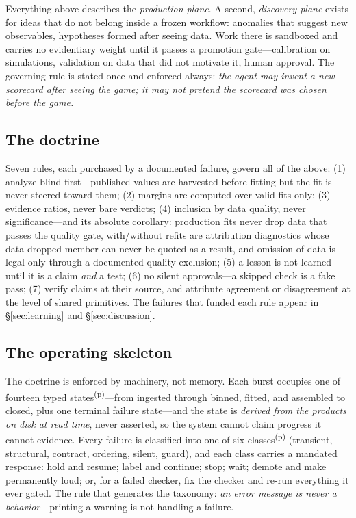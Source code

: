 \documentclass[twocolumn]{aastex631}
\newcommand{\prov}{\textsuperscript{(p)}}   %
\begin{document}
Everything above describes the \emph{production plane}. A second,
\emph{discovery plane} exists for ideas that do not belong inside a frozen
workflow: anomalies that suggest new observables, hypotheses formed after
seeing data. Work there is sandboxed and carries no evidentiary weight until
it passes a promotion gate---calibration on simulations, validation on data
that did not motivate it, human approval. The governing rule is stated once
and enforced always: \emph{the agent may invent a new scorecard after seeing
the game; it may not pretend the scorecard was chosen before the game.}

\subsection{The doctrine} \label{sec:doctrine}

Seven rules, each purchased by a documented failure, govern all of the
above: (1) analyze blind first---published values are harvested before
fitting but the fit is never steered toward them; (2) margins are computed
over valid fits only; (3) evidence ratios, never bare verdicts; (4)
inclusion by data quality, never significance---and its absolute corollary:
production fits never drop data that passes the quality gate, with/without
refits are attribution diagnostics whose data-dropped member can never be
quoted as a result, and omission of data is legal only through a documented
quality exclusion; (5) a lesson is not learned
until it is a claim \emph{and} a test; (6) no silent approvals---a skipped
check is a fake pass; (7) verify claims at their source, and attribute
agreement or disagreement at the level of shared primitives. The failures
that funded each rule appear in \S\ref{sec:learning} and
\S\ref{sec:discussion}.

\subsection{The operating skeleton} \label{sec:skeleton}

The doctrine is enforced by machinery, not memory. Each burst occupies one
of fourteen typed states\prov---from ingested through binned, fitted, and
assembled to closed, plus one terminal failure state---and the state is
\emph{derived from the products on disk at read time}, never asserted, so
the system cannot claim progress it cannot evidence. Every failure is
classified into one of six classes\prov{} (transient, structural, contract,
ordering, silent, guard), and each class carries a mandated response: hold
and resume; label and continue; stop; wait; demote and make permanently
loud; or, for a failed checker, fix the checker and re-run everything it
ever gated. The rule that generates the taxonomy: \emph{an error message
is never a behavior}---printing a warning is not handling a failure.
\end{document}
